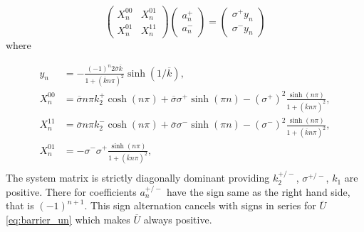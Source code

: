 \documentclass[a4paper,10pt]{article}
\def\ol#1{\overline{#1}}
\begin{document}
\begin{equation}
    \label{eq:an_system}
    \begin{pmatrix} 
            X_n^{00} & X_n^{01} \\ 
            X_n^{01} & X_n^{11}
    \end{pmatrix}
    \begin{pmatrix} 
        a_n^+  \\ 
        a_n^-     
    \end{pmatrix}
     =  
    \begin{pmatrix} 
        \sigma^{+}y_n \\ 
        \sigma^{-}y_n
    \end{pmatrix}
\end{equation}
where
% 

\begin{align}
    \label{eq:yn}    
    y_n     &= -\frac{(-1)^n 2 \ol{\sigma}\ol{k}}{1+(\ol{k} n \pi)^2}\sinh(1/\ol{k}), \\
    X_n^{00}  &= \ol{\sigma}n \pi k_2^+\cosh(n \pi) 
              + \ol{\sigma}\sigma^+\sinh(\pi n)  - (\sigma^+)^2 \frac{\sinh(n \pi)}{1 + (\ol{k} n \pi)^2}, \\    
    X_n^{11}  &= \ol{\sigma}n \pi k_2^-  \cosh(n \pi) 
              + \ol{\sigma}\sigma^-\sinh(\pi n)    - (\sigma^-)^2 \frac{\sinh(n \pi)}{1 + (\ol{k} n \pi)^2}, \\
    X_n^{01}  &= -\sigma^- \sigma^+\frac{\sinh(n \pi)}{1 + (\ol{k} n \pi)^2}, \\    
\end{align}
The system matrix is strictly diagonally dominant providing $k_2^{+/-}$, $\sigma^{+/-}$, $k_1$ are positive.
There for coefficients $a_n^{+/-}$ have the sign same as the right hand side, that is $(-1)^{n+1}$. This sign
alternation cancels with signs in series for $\ol{U}$ \eqref{eq:barrier_un} which makes $\ol{U}$ always positive.
\end{document}
